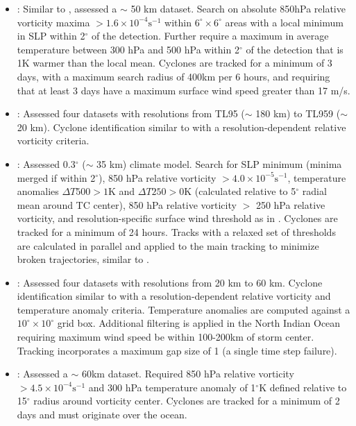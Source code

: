 \documentclass[gmdd, hvmath]{copernicus}
\begin{document}
\begin{itemize}
\item \cite{knutson2007simulation, zhao2009simulations}:  Similar to \citet{vitart1997simulation, vitart2003mozambique}, assessed a $\sim$ 50 km dataset.  Search on absolute 850hPa relative vorticity maxima $> 1.6 \times 10^{-4} \mbox{s}^{-1}$ within $6^\circ \times 6^\circ$ areas with a local minimum in SLP within 2$^\circ$ of the detection.  Further require a maximum in average temperature between 300 hPa and 500 hPa within 2$^\circ$ of the detection that is 1K warmer than the local mean.  Cyclones are tracked for a minimum of 3 days, with a maximum search radius of 400km per 6 hours, and requiring that at least 3 days have a maximum surface wind speed greater than 17 m/s.

\item \cite{murakami2010effect}:  Assessed four datasets with resolutions from TL95 ($\sim$ 180 km) to TL959 ($\sim$ 20 km).  Cyclone identification similar to \cite{oouchi2006tropical} with a resolution-dependent relative vorticity criteria.

\item \cite{caron2011resolution,caron2013relationship}:  Assessed 0.3$^\circ$ ($\sim$ 35 km) climate model. Search for SLP minimum (minima merged if within 2$^\circ$), 850 hPa relative vorticity $> 4.0 \times 10^{-5} \mbox{s}^{-1}$, temperature anomalies $\Delta T500 > 1$K and $\Delta T250 > 0$K (calculated relative to 5$^\circ$ radial mean around TC center), 850 hPa relative vorticity $>$ 250 hPa relative vorticity, and resolution-specific surface wind threshold as in \citet{walsh2007objectively}.  Cyclones are tracked for a minimum of 24 hours. Tracks with a relaxed set of thresholds are calculated in parallel and applied to the main tracking to minimize broken trajectories, similar to \citet{camargo2002improving}.

\item \cite{murakami2012future}:  Assessed four datasets with resolutions from 20 km to 60 km.  Cyclone identification similar to \cite{oouchi2006tropical} with a resolution-dependent relative vorticity and temperature anomaly criteria.  Temperature anomalies are computed against a $10^\circ \times 10^\circ$ grid box.  Additional filtering is applied in the North Indian Ocean requiring maximum wind speed be within 100-200km of storm center.  Tracking incorporates a maximum gap size of 1 (a single time step failure).

\item \cite{auyeung2012regcm, huang2014wpac}: Assessed a $\sim$ 60km dataset. Required 850 hPa relative vorticity $> 4.5 \times 10^{-4} \mbox{s}^{-1}$ and 300 hPa temperature anomaly of 1$^\circ$K defined relative to 15$^\circ$ radius around vorticity center. Cyclones are tracked for a minimum of 2 days and must originate over the ocean.


\end{itemize}
\end{document}
